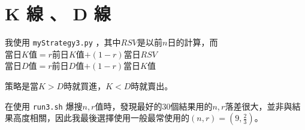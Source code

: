 \section{K 線 、 D 線}

我使用 \texttt{myStrategy3.py} ，其中$RSV$是以前$n$日的計算，而\\
當日$K$值$=r$前日$K$值$+(1-r)$當日$RSV$\\
當日$D$值$=r$前日$D$值$+(1-r)$當日$K$值

策略是當$K>D$時就買進，$K<D$時就賣出。

在使用 \texttt{run3.sh} 爆搜$n, r$值時，發現最好的$30$個結果用的$n, r$落差很大，並非與結果高度相關，因此我最後選擇使用一般最常使用的$(n, r)=(9, \frac23)$。
